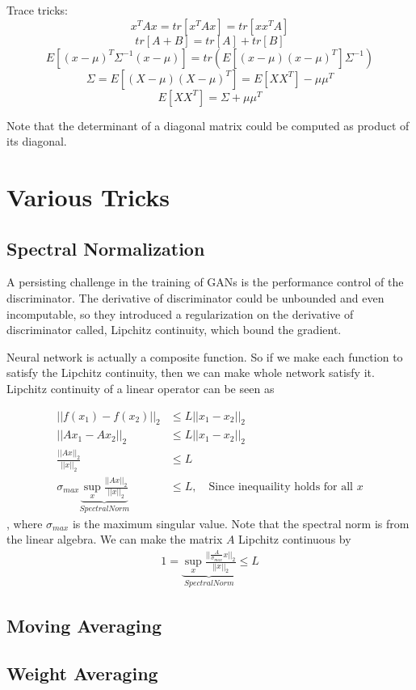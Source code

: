 \begin{appendices}
Trace tricks:
$$x^TAx = tr[x^TAx] = tr[xx^TA]$$
$$tr[A+B] = tr[A]+tr[B]$$
$$E[(x-\mu)^T \Sigma^{-1} (x-\mu)]= tr(E[(x-\mu)(x-\mu)^T] \Sigma^{-1})$$
$$\Sigma = E[(X-\mu)(X-\mu)^T]=E[XX^T]-\mu\mu^T$$
$$E[XX^T] = \Sigma + \mu\mu^T$$

Note that the determinant of a diagonal matrix could be computed as product of its diagonal.


\section{Various Tricks}

\subsection{Spectral Normalization}

A persisting challenge in the training of GANs is the performance control of the discriminator. The derivative of discriminator could be unbounded and even incomputable, so they introduced a regularization on the derivative of discriminator called, Lipchitz continuity, which bound the gradient.

Neural network is actually a composite function. So if we make each function to satisfy the Lipchitz continuity, then we can make whole network satisfy it. Lipchitz continuity of a linear operator can be seen as 

\begin{align*}
	||f(x_1)-f(x_2)||_2 &\leq L||x_1-x_2||_2\\
	||Ax_1-Ax_2||_2 &\leq L||x_1-x_2||_2\\
	\frac{||Ax||_2}{||x||_2}&\leq L\\
	\sigma_{max}\underbrace{\sup_x \frac{||Ax||_2}{||x||_2}}_{Spectral Norm}&\leq L, \quad \textrm{Since inequaility holds for all }x
\end{align*}
, where $\sigma_{max}$ is the maximum singular value. Note that the spectral norm is from the linear algebra. We can make the matrix $A$ Lipchitz continuous by 
\begin{align*}
1 = \underbrace{\sup_x \frac{||\frac{A}{\sigma_{max}}x||_2}{||x||_2}}_{Spectral Norm}\leq L
\end{align*}


\subsection{Moving Averaging}

\subsection{Weight Averaging}


\end{appendices}
